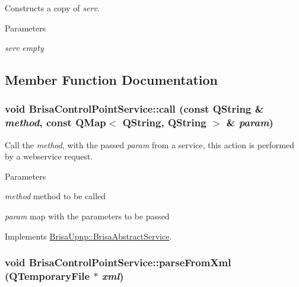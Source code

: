 Constructs a copy of {\itshape serv\/}. 
\begin{DoxyParams}{Parameters}
\item[{\em serv}]{\itshape empty\/} \end{DoxyParams}


\subsection{Member Function Documentation}
\hypertarget{classBrisaUpnp_1_1BrisaControlPointService_a2ceea746418759667ca7393abbb7a412}{
\subsubsection[{call}]{\setlength{\rightskip}{0pt plus 5cm}void BrisaControlPointService::call (const QString \& {\em method}, \/  const QMap$<$ QString, QString $>$ \& {\em param})}}
\label{classBrisaUpnp_1_1BrisaControlPointService_a2ceea746418759667ca7393abbb7a412}


Call the {\itshape method\/}, with the passed {\itshape param\/} from a service, this action is performed by a webservice request. 
\begin{DoxyParams}{Parameters}
\item[{\em method}]method to be called \item[{\em param}]map with the parameters to be passed \end{DoxyParams}


Implements \hyperlink{classBrisaUpnp_1_1BrisaAbstractService_ade3461839c097933b60f5b8d8fba7290}{BrisaUpnp::BrisaAbstractService}.\hypertarget{classBrisaUpnp_1_1BrisaControlPointService_af24bbef6116b25cd4dfb3433d6b18199}{
\subsubsection[{parseFromXml}]{\setlength{\rightskip}{0pt plus 5cm}void BrisaControlPointService::parseFromXml (QTemporaryFile $\ast$ {\em xml})}}
\label{classBrisaUpnp_1_1BrisaControlPointService_af24bbef6116b25cd4dfb3433d6b18199}


